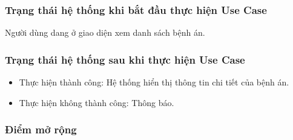 \subsubsection{Trạng thái hệ thống khi bắt đầu thực hiện Use Case}
Người dùng dang ở giao diện xem danh sách bệnh án.

\subsubsection{Trạng thái hệ thống sau khi thực hiện Use Case}
\begin{itemize}
    \item Thực hiện thành công: Hệ thống hiển thị thông tin chi tiết của bệnh án.
    \item Thực hiện không thành công: Thông báo.
\end{itemize}

\subsubsection{Điểm mở rộng}